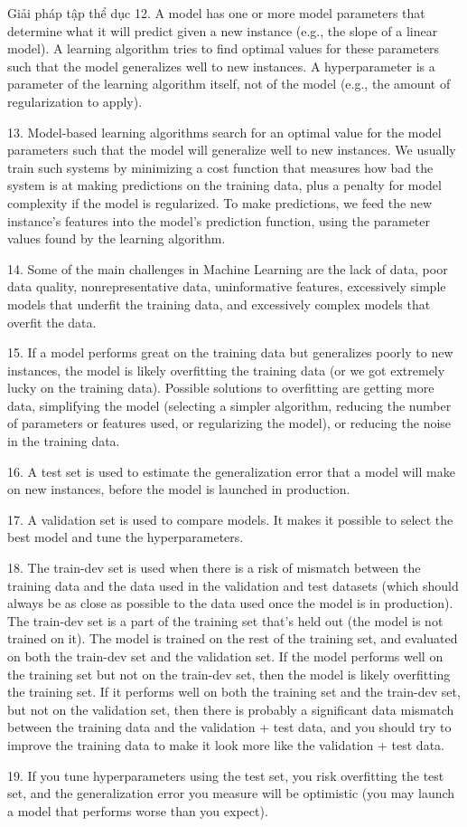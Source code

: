 \documentclass[aspectratio=169]{beamer}
\begin{document}
\begin{frame}[allowframebreaks]{Giải pháp tập thể dục}
12. A model has one or more model parameters that determine what it will predict given a new instance (e.g., the slope of a linear model). A learning algorithm tries to find optimal values for these parameters such that the model generalizes well to new instances. A hyperparameter is a parameter of the learning algorithm itself, not of the model (e.g., the amount of regularization to apply).

13. Model-based learning algorithms search for an optimal value for the model parameters such that the model will generalize well to new instances. We usually train such systems by minimizing a cost function that measures how bad the system is at making predictions on the training data, plus a penalty for model complexity if the model is regularized. To make predictions, we feed the new instance's features into the model's prediction function, using the parameter values found by the learning algorithm.

14. Some of the main challenges in Machine Learning are the lack of data, poor data quality, nonrepresentative data, uninformative features, excessively simple models that underfit the training data, and excessively complex models that overfit the data.

15. If a model performs great on the training data but generalizes poorly to new instances, the model is likely overfitting the training data (or we got extremely lucky on the training data). Possible solutions to overfitting are getting more data, simplifying the model (selecting a simpler algorithm, reducing the number of parameters or features used, or regularizing the model), or reducing the noise in the training data.

16. A test set is used to estimate the generalization error that a model will make on new instances, before the model is launched in production.

17. A validation set is used to compare models. It makes it possible to select the best model and tune the hyperparameters.

18. The train-dev set is used when there is a risk of mismatch between the training data and the data used in the validation and test datasets (which should always be as close as possible to the data used once the model is in production). The train-dev set is a part of the training set that's held out (the model is not trained on it). The model is trained on the rest of the training set, and evaluated on both the train-dev set and the validation set. If the model performs well on the training set but not on the train-dev set, then the model is likely overfitting the training set. If it performs well on both the training set and the train-dev set, but not on the validation set, then there is probably a significant data mismatch between the training data and the validation + test data, and you should try to improve the training data to make it look more like the validation + test data.

19. If you tune hyperparameters using the test set, you risk overfitting the test set, and the generalization error you measure will be optimistic (you may launch a model that performs worse than you expect).


\end{frame}
\end{document}
